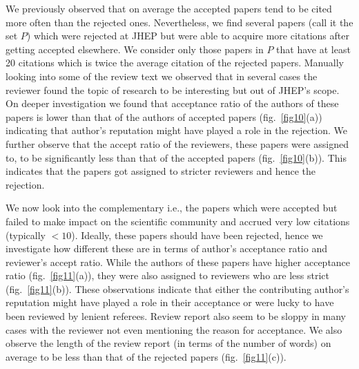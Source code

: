  We previously observed that on average the accepted papers tend to be cited more often than the rejected ones. Nevertheless, we find several papers (call it the set $P$) which were rejected at JHEP but were able to acquire more citations after getting accepted elsewhere. We consider only those papers in $P$ that have at least 20 citations which is twice the average citation of the rejected papers.
Manually looking into some of the review text we observed that in several cases the reviewer found the topic of research to be interesting but out of JHEP's scope. On deeper investigation we found that acceptance ratio of the authors of these papers is lower than that of the authors of accepted papers (fig.~\ref{fig10}(a)) indicating that author's reputation might have played a role in the rejection. We further observe that the accept ratio of the reviewers, these papers were assigned to, to be significantly less than that of the accepted papers (fig.~\ref{fig10}(b)). This indicates that the papers got assigned to stricter reviewers and hence the rejection.

 We now look into the complementary i.e., the papers which were accepted but failed to make impact on the scientific community and accrued very low citations (typically $< 10$). Ideally, these papers should have been rejected, hence we investigate how different these are in terms of author's acceptance ratio and reviewer's accept ratio. While the authors of these papers have higher acceptance ratio (fig.~\ref{fig11}(a)), they were also assigned to reviewers who are less strict (fig.~\ref{fig11}(b)). These observations indicate that either the contributing author's reputation might have played a role in their acceptance or were lucky to have been reviewed by lenient referees. Review report also seem to be sloppy in many cases with the reviewer not even mentioning the reason for acceptance. We also observe the length of the review report (in terms of the number of words) on average to be less than that of the rejected papers (fig.~\ref{fig11}(c)). 
